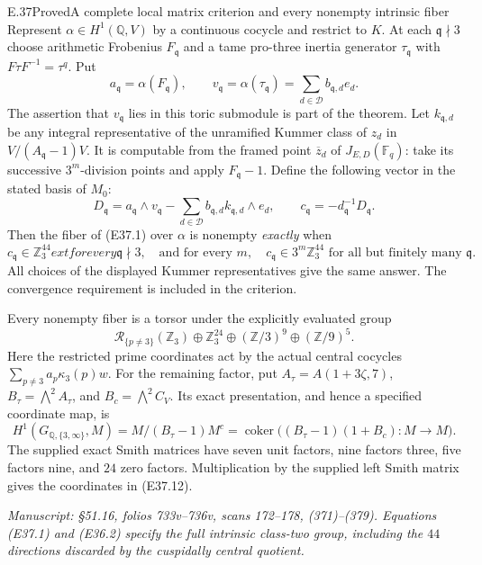 \begin{statement}{E.37}{Proved}{A complete local matrix criterion and every nonempty intrinsic fiber}
Represent $\alpha\in H^1(\mathbb Q,V)$ by a continuous
cocycle and restrict to $K$. At each $\mathfrak q\nmid3$
choose arithmetic Frobenius $F_{\mathfrak q}$ and a tame
pro-three inertia generator $\tau_{\mathfrak q}$ with
$F\tau F^{-1}=\tau^q$. Put
\[
 a_{\mathfrak q}=\alpha(F_{\mathfrak q}),\qquad
 v_{\mathfrak q}=\alpha(\tau_{\mathfrak q})
             =\sum_{d\in\mathcal D}b_{\mathfrak q,d}e_d .
 \tag{E37.9}
\]
The assertion that $v_{\mathfrak q}$ lies in this toric
submodule is part of the theorem. Let $k_{\mathfrak q,d}$
be any integral representative of the unramified Kummer
class of $z_d$ in
$V/(A_{\mathfrak q}-1)V$.
It is computable from the framed point $\overline z_d$
of $J_{E,D}(\mathbb F_q)$: take its successive
$3^m$-division points and apply $F_{\mathfrak q}-1$.
Define the following vector in the stated basis of $M_0$:
\[
 D_{\mathfrak q}
   =a_{\mathfrak q}\wedge v_{\mathfrak q}
      -\sum_{d\in\mathcal D}b_{\mathfrak q,d}
                         k_{\mathfrak q,d}\wedge e_d,
 \qquad
 c_{\mathfrak q}=-d_{\mathfrak q}^{-1}D_{\mathfrak q}.
 \tag{E37.10}
\]
Then the fiber of (E37.1) over $\alpha$ is nonempty
\emph{exactly} when
\[
 c_{\mathfrak q}\in\mathbb Z_3^{44}	ext{ for every }\mathfrak q\nmid3,
 \quad\text{and for every }m,\quad
 c_{\mathfrak q}\in3^m\mathbb Z_3^{44}
                   \text{ for all but finitely many }\mathfrak q.
 \tag{E37.11}
\]
All choices of the displayed Kummer representatives give
the same answer. The convergence requirement is included
in the criterion.

Every nonempty fiber is a torsor under the explicitly
evaluated group
\[
 \mathcal R_{\{p\ne3\}}(\mathbb Z_3)
       \oplus\mathbb Z_3^{24}
       \oplus(\mathbb Z/3)^9\oplus(\mathbb Z/9)^5 .
 \tag{E37.12}
\]
Here the restricted prime coordinates act by the actual
central cocycles $\sum_{p\ne3}a_p\kappa_3(p)w$.
For the remaining factor, put
$A_\tau=A(1+3\zeta,7)$,
$B_\tau=\bigwedge^2A_\tau$, and
$B_c=\bigwedge^2C_V$.
Its exact presentation, and hence a specified coordinate
map, is
\[
 H^1(G_{\mathbb Q,\{3,\infty\}},M)
   =M/(B_\tau-1)M^{c}
   =\operatorname{coker}\bigl((B_\tau-1)(1+B_c):M\to M\bigr).
 \tag{E37.13}
\]
The supplied exact Smith matrices have seven unit factors,
nine factors three, five factors nine, and $24$ zero
factors. Multiplication by the supplied left Smith matrix
gives the coordinates in (E37.12).

\emph{Manuscript: \S51.16, folios 733v--736v, scans 172--178,
(371)--(379). Equations (E37.1) and (E36.2) specify the
full intrinsic class-two group, including the $44$
directions discarded by the cuspidally central quotient.}
\end{statement}

